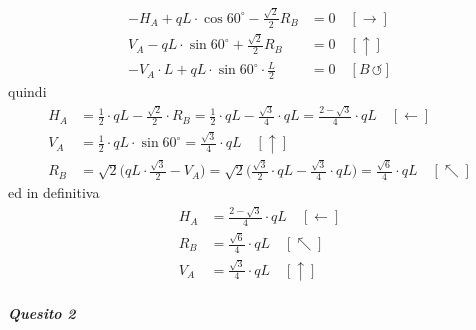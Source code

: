 \begin{align*}
-H_{A} + qL\cdot\cos{60^{\circ}} - \frac{\sqrt{2}}{2}R_{B} &= 0 \quad [\rightarrow] \\ 
V_{A} - qL\cdot \sin{60^{\circ}} + \frac{\sqrt{2}}{2}R_{B} &= 0 \quad [\uparrow] \\
-V_{A}\cdot L + qL\cdot \sin{60^{\circ}} \cdot \frac{L}{2} &= 0 \quad [B\,\circlearrowleft]
\end{align*}
quindi
\begin{align*}
H_{A} &= \frac{1}{2}\cdot qL - \frac{\sqrt{2}}{2}\cdot R_{B} = \frac{1}{2}\cdot qL - \frac{\sqrt{3}}{4}\cdot qL = \frac{2 - \sqrt{3}}{4}\cdot qL \quad [\leftarrow] \\ 
V_{A} &= \frac{1}{2}\cdot qL\cdot \sin{60^{\circ}} = \frac{\sqrt{3}}{4}\cdot qL  \quad [\uparrow] \\
R_{B} &= \sqrt{2}\biggl( qL\cdot \frac{\sqrt{3}}{2} - V_{A} \biggr) = \sqrt{2}\biggl(  \frac{\sqrt{3}}{2}\cdot qL - \frac{\sqrt{3}}{4}\cdot qL \biggr) = \frac{\sqrt{6}}{4}\cdot qL  \quad [\nwarrow]
\end{align*}
ed in definitiva
\begin{subequations}
\begin{align}
H_{A} &= \frac{2 - \sqrt{3}}{4}\cdot qL \quad [\leftarrow] \label{equazione12-1-1a} \tag{12.1.1a} \\
R_{B} &= \frac{\sqrt{6}}{4}\cdot qL  \quad [\nwarrow] \label{equazione12-1-1b} \tag{12.1.1b} \\ 
V_{A} &= \frac{\sqrt{3}}{4}\cdot qL \quad [\uparrow] \label{equazione12-1-1c} \tag{12.1.1c}
\end{align}
\end{subequations}
\subparagraph{Quesito 2}
